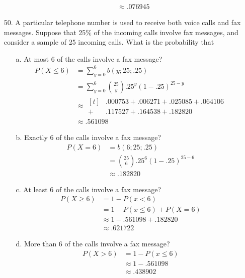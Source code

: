 \documentclass[letterpaper,12pt]{article}
\newcommand{\bp}[3]{%
  \binom{#2}{#1}#3^{#1}(1 - #3)^{#2 - #1}%
}
\begin{document}
\begin{enumerate}
\begin{enumerate}
\begin{align*}
          &\approx .076945
        \end{align*}
    \end{enumerate}
  \item[50.]
    A particular telephone number is used to receive both voice calls and fax messages. Suppose that 25\% of the incoming calls involve fax messages, and consider a sample of 25 incoming calls. What is the probability that
    \begin{enumerate}
      \item[a.]
        At most 6 of the calls involve a fax message?
        \begin{align*}
          P(X \le 6) &= \sum_{y = 0}^6 b(y; 25; .25) \\
          &= \sum_{y = 0}^6 \bp{y}{25}{.25} \\
          &\approx \begin{aligned}[t]
              &.000753 + .006271 + .025085 + .064106 \\
            + &.117527 + .164538 + .182820
          \end{aligned} \\
          &\approx .561098
        \end{align*}
      \item[b.]
        Exactly 6 of the calls involve a fax message?
        \begin{align*}
          P(X = 6) &= b(6; 25; .25) \\
          &= \bp{6}{25}{.25} \\
          &\approx .182820
        \end{align*}
      \item[c.]
        At least 6 of the calls involve a fax message?
        \begin{align*}
          P(X \ge 6) &= 1 - P(x < 6) \\
          &= 1 - P(x \le 6) + P(X = 6) \\
          &\approx 1 - .561098 + .182820 \\
          &\approx .621722
        \end{align*}
      \item[d.]
        More than 6 of the calls involve a fax message?
        \begin{align*}
          P(X > 6) &= 1 - P(x \le 6) \\
          &\approx 1 - .561098 \\
          &\approx  .438902
        \end{align*}
    \end{enumerate}

\end{enumerate}
\end{document}
